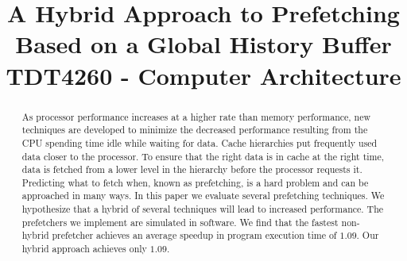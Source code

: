 \documentclass[technote]{IEEEtran}
\begin{document}
\title{A Hybrid Approach to Prefetching Based on a Global History Buffer\\ TDT4260 - Computer Architecture}

\author{

}

\maketitle

\begin{abstract}
  As processor performance increases at a higher rate than memory performance, new techniques are developed to minimize the decreased performance resulting from the CPU spending time idle while waiting for data. Cache hierarchies put frequently used data closer to the processor. To ensure that the right data is in cache at the right time, data is fetched from a lower level in the hierarchy before the processor requests it. Predicting what to fetch when, known as prefetching, is a hard problem and can be approached in many ways. In this paper we evaluate several prefetching techniques. We hypothesize that a hybrid of several techniques will lead to increased performance. The prefetchers we implement are simulated in software. We find that the fastest non-hybrid prefetcher achieves an average speedup in program execution time of $1.09$. Our hybrid approach achieves only $1.09$.
\end{abstract}

\listoftodos










\end{document}
